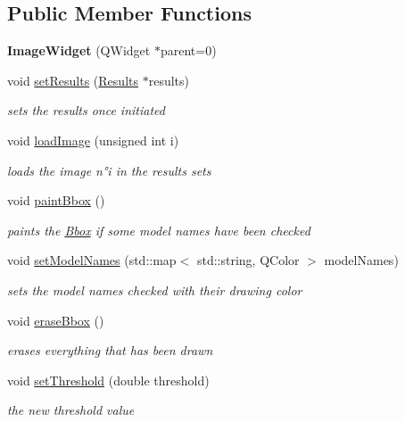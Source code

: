 \subsection*{Public Member Functions}
\begin{DoxyCompactItemize}
\item 
{\bfseries Image\+Widget} (Q\+Widget $\ast$parent=0)\hypertarget{class_image_widget_a29f5483569b0ac4abd6b25bb640f9250}{}\label{class_image_widget_a29f5483569b0ac4abd6b25bb640f9250}

\item 
void \hyperlink{class_image_widget_a0e3dfd9d7747707f659310b175629e5e}{set\+Results} (\hyperlink{class_results}{Results} $\ast$results)
\begin{DoxyCompactList}\small\item\em sets the results once initiated \end{DoxyCompactList}\item 
void \hyperlink{class_image_widget_ac41822f2c322b22eb62ac553011b0423}{load\+Image} (unsigned int i)
\begin{DoxyCompactList}\small\item\em loads the image n°i in the results sets \end{DoxyCompactList}\item 
void \hyperlink{class_image_widget_a10cd7197e52740e168ef5261aa16ca7a}{paint\+Bbox} ()\hypertarget{class_image_widget_a10cd7197e52740e168ef5261aa16ca7a}{}\label{class_image_widget_a10cd7197e52740e168ef5261aa16ca7a}

\begin{DoxyCompactList}\small\item\em paints the \hyperlink{class_bbox}{Bbox} if some model names have been checked \end{DoxyCompactList}\item 
void \hyperlink{class_image_widget_a774f0d94f4cd8a0ed0d7c8a30b20da56}{set\+Model\+Names} (std\+::map$<$ std\+::string, Q\+Color $>$ model\+Names)
\begin{DoxyCompactList}\small\item\em sets the model names checked with their drawing color \end{DoxyCompactList}\item 
void \hyperlink{class_image_widget_ae572ff8733d9ece83441a37e1b7a91ae}{erase\+Bbox} ()\hypertarget{class_image_widget_ae572ff8733d9ece83441a37e1b7a91ae}{}\label{class_image_widget_ae572ff8733d9ece83441a37e1b7a91ae}

\begin{DoxyCompactList}\small\item\em erases everything that has been drawn \end{DoxyCompactList}\item 
void \hyperlink{class_image_widget_a6180527a08974bc832d10deccc9e3737}{set\+Threshold} (double threshold)
\begin{DoxyCompactList}\small\item\em the new threshold value \end{DoxyCompactList}\end{DoxyCompactItemize}


